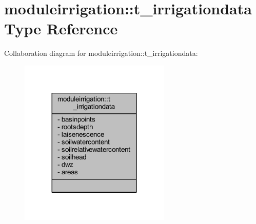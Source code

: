 \hypertarget{structmoduleirrigation_1_1t__irrigationdata}{}\section{moduleirrigation\+:\+:t\+\_\+irrigationdata Type Reference}
\label{structmoduleirrigation_1_1t__irrigationdata}


Collaboration diagram for moduleirrigation\+:\+:t\+\_\+irrigationdata\+:\nopagebreak
\begin{figure}[H]
\begin{center}
\leavevmode
\includegraphics[width=203pt]{structmoduleirrigation_1_1t__irrigationdata__coll__graph}
\end{center}
\end{figure}
